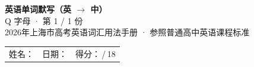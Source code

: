 \documentclass[10pt,a4paper]{article}
\begin{document}
\pagestyle{plain}

\begin{center}
{\LARGE\bfseries 英语单词默写（英 $\to$ 中）}\\[0.22em]
{\large Q 字母 · 第 1 / 1 份}\\[0.18em]
{\small 2026年上海市高考英语词汇用法手册 · 参照普通高中英语课程标准}
\end{center}

\vspace{0.25em}
\noindent\begin{tabular}{@{}p{}@{}p{}@{}p{}@{}}
姓名：\underline{\hspace{2.0cm}} & 日期：\underline{\hspace{2.0cm}} & 得分：\underline{\hspace{1.3cm}}\,/\,18 \\
\end{tabular}

\vspace{0.3em}

\vspace{0.08em}
\end{document}
